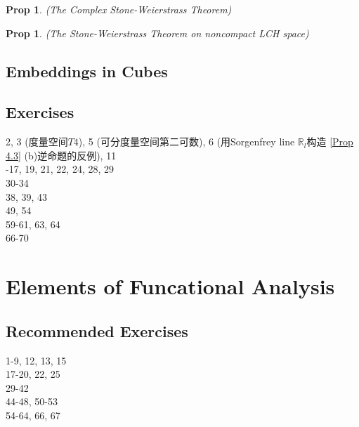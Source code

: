\documentclass[hidelinks]{article}
\theoremstyle{definition}
\theoremstyle{plain}
\newtheorem{proposition}[theorem]{Prop}
\theoremstyle{remark}
\begin{document}
\begin{proposition} (The Complex Stone-Weierstrass Theorem) \\

\end{proposition}

\begin{proposition} (The Stone-Weierstrass Theorem on noncompact LCH space)

\end{proposition}

\subsection{Embeddings in Cubes}




\subsection{Exercises}
2, 3 (度量空间$T4$), 5 (可分度量空间第二可数), 6 (用Sorgenfrey line $\mathbb{R}_l$构造 \autoref{Prop 4.3} (b)逆命题的反例), 11 \\
-17, 19, 21, 22, 24, 28, 29 \\
30-34 \\
38, 39, 43 \\
49, 54 \\
59-61, 63, 64 \\
66-70 \\
\newpage

\section{Elements of Funcational Analysis}



\subsection{Recommended Exercises}
1-9, 12, 13, 15 \\
17-20, 22, 25 \\
29-42 \\
44-48, 50-53 \\
54-64, 66, 67 \\
\end{document}
